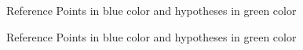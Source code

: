 \begin{figure}
\begin{center}
\caption{\label{fig:Construction}Reference Points in blue color and hypotheses in green color}
\end{center}
\end{figure}

\begin{figure}
\begin{center}
\caption{\label{fig:Construction}Reference Points in blue color and hypotheses in green color}
\end{center}
\end{figure}







